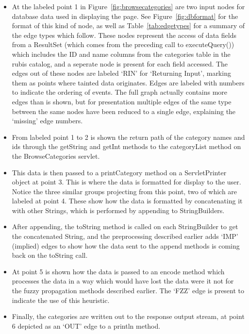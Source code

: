 \documentclass[msc,oneside]{ubcthesis}
\begin{document}
\begin{itemize}
\item At the labeled point 1 in Figure~\ref{fig:browsecategories} are two input nodes for database data used in displaying the page. See Figure~\ref{fig:dbformat} for the format of this kind of node, as well as Table~\ref{tab:edgetypes} for a summary of the edge types which follow. These nodes represent the access of data fields from a ResultSet (which comes from the preceding call to executeQuery()) which includes the ID and name columns from the categories table in the rubis catalog, and a seperate node is present for each field accessed. The edges out of these nodes are labeled `RIN' for `Returning Input', marking them as points where tainted data originates. Edges are labeled with numbers to indicate the ordering of events. The full graph actually contains more edges than is shown, but for presentation multiple edges of the same type between the same nodes have been reduced to a single edge, explaining the `missing' edge numbers.
\item From labeled point 1 to 2 is shown the return path of the category names and ids through the getString and getInt methods to the categoryList method on the BrowseCategories servlet. 
\item This data is then passed to a printCategory method on a ServletPrinter object at point 3. This is where the data is formatted for display to the user. Notice the three similar groups projecting from this point, two of which are labeled at point 4. These show how the data is formatted by concatenating it with other Strings, which is performed by appending to StringBuilders.
\item After appending, the toString method is called on each StringBuilder to get the concatenated String, and the preprocessing described earlier adds `IMP' (implied) edges to show how the data sent to the append methods is coming back on the toString call.
\item At point 5 is shown how the data is passed to an encode method which processes the data in a way which would have lost the data were it not for the fuzzy propagation methods described earlier. The `FZZ' edge is present to indicate the use of this heuristic.
\item Finally, the categories are written out to the response output stream, at point 6 depicted as an `OUT' edge to a println method.
\end{itemize}   

\end{document}
